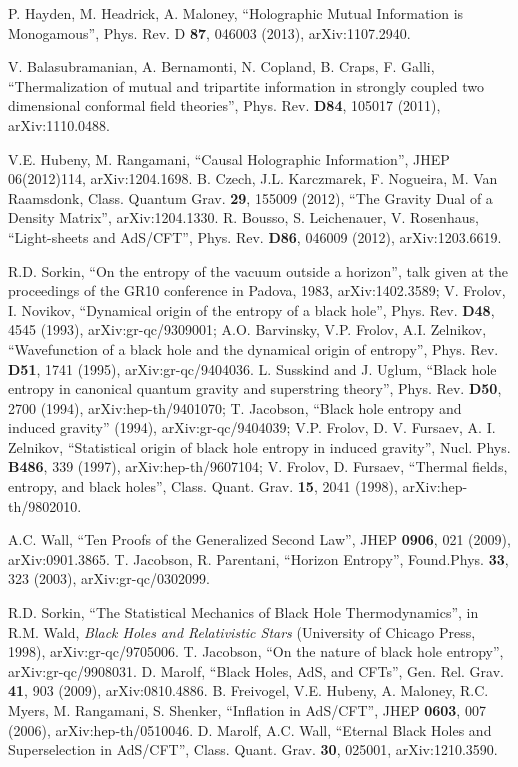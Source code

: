 \documentclass{article}
\begin{document}
\begin{thebibliography}{99}
P. Hayden, M. Headrick, A. Maloney, ``Holographic Mutual Information is Monogamous'', Phys. Rev. D \textbf{87}, 046003 (2013), arXiv:1107.2940.

V. Balasubramanian, A. Bernamonti, N. Copland, B. Craps, F. Galli, ``Thermalization of mutual and tripartite information in strongly coupled two dimensional conformal field theories'', Phys. Rev. \textbf{D84}, 105017 (2011), arXiv:1110.0488.

V.E. Hubeny, M. Rangamani, ``Causal Holographic Information'', JHEP 06(2012)114, arXiv:1204.1698.
B. Czech, J.L. Karczmarek, F. Nogueira, M. Van Raamsdonk, Class. Quantum Grav. \textbf{29}, 155009 (2012), ``The Gravity Dual of a Density Matrix'', arXiv:1204.1330.
R. Bousso, S. Leichenauer, V. Rosenhaus, ``Light-sheets and AdS/CFT'', Phys. Rev. \textbf{D86}, 046009 (2012),  arXiv:1203.6619.

R.D. Sorkin, ``On the entropy of the vacuum outside a horizon'', talk given 
at the proceedings of the GR10 conference in Padova, 1983, arXiv:1402.3589;
V. Frolov, I. Novikov, ``Dynamical origin of the entropy of a black hole'', Phys. Rev. \textbf{D48}, 4545 (1993), 
arXiv:gr-qc/9309001; 
A.O. Barvinsky, V.P. Frolov, A.I. Zelnikov, ``Wavefunction of a black hole and the dynamical origin of entropy'', Phys. Rev. \textbf{D51}, 1741 (1995), arXiv:gr-qc/9404036.
L. Susskind and J. Uglum, ``Black hole entropy in canonical quantum gravity and superstring theory'', Phys. Rev. \textbf{D50}, 2700 (1994), arXiv:hep-th/9401070; 
T. Jacobson, ``Black hole entropy and induced gravity'' (1994), arXiv:gr-qc/9404039; 
V.P. Frolov, D. V. Fursaev, A. I. Zelnikov, ``Statistical origin of black hole entropy in induced gravity'', 
Nucl. Phys. \textbf{B486}, 339 (1997), arXiv:hep-th/9607104; 
V. Frolov, D. Fursaev, ``Thermal fields, entropy, and black holes'', Class. Quant. Grav. \textbf{15}, 2041 (1998), arXiv:hep-th/9802010.

A.C. Wall, ``Ten Proofs of the Generalized Second Law'', JHEP \textbf{0906}, 021 (2009), arXiv:0901.3865.
T. Jacobson, R. Parentani, ``Horizon Entropy'', Found.Phys. \textbf{33}, 323 (2003), arXiv:gr-qc/0302099.

R.D. Sorkin, ``The Statistical Mechanics of Black Hole Thermodynamics'', in R.M. Wald, \textit{Black Holes and Relativistic Stars} (University of Chicago Press, 1998), arXiv:gr-qc/9705006.
T. Jacobson, ``On the nature of black hole entropy'',  arXiv:gr-qc/9908031.
D. Marolf, ``Black Holes, AdS, and CFTs'', Gen. Rel. Grav. \textbf{41}, 903 (2009), arXiv:0810.4886.
B. Freivogel, V.E. Hubeny, A. Maloney, R.C. Myers, M. Rangamani, S. Shenker, ``Inflation in AdS/CFT'', JHEP \textbf{0603}, 007 (2006),  arXiv:hep-th/0510046.
D. Marolf, A.C. Wall, ``Eternal Black Holes and Superselection in AdS/CFT'', Class. Quant. Grav. \textbf{30}, 025001, arXiv:1210.3590.


\end{thebibliography}
\end{document}
